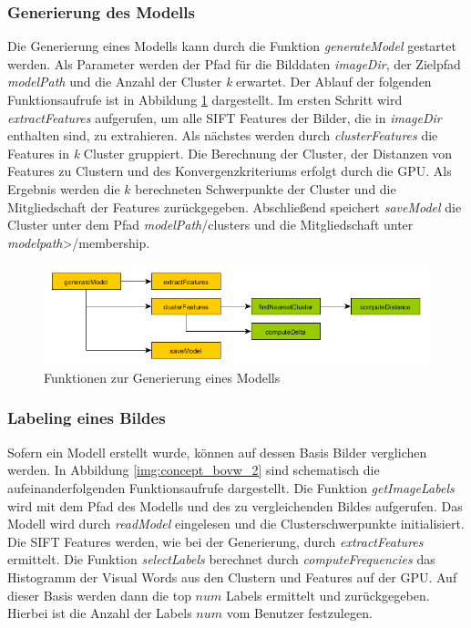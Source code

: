 \subsubsection{Generierung des Modells}

Die Generierung eines Modells kann durch die Funktion \textit{generateModel} gestartet werden. Als Parameter werden der Pfad für die Bilddaten \textit{imageDir}, der Zielpfad \textit{modelPath} und die Anzahl der Cluster \textit{k} erwartet. Der Ablauf der folgenden Funktionsaufrufe ist in Abbildung \ref{img:concept_bovw_1} dargestellt. Im ersten Schritt wird \textit{extractFeatures} aufgerufen, um alle SIFT Features der Bilder, die in \textit{imageDir} enthalten sind, zu extrahieren. Als nächstes werden durch \textit{clusterFeatures} die Features in \textit{k} Cluster gruppiert. Die Berechnung der Cluster, der Distanzen von Features zu Clustern und des Konvergenzkriteriums erfolgt durch die GPU. Als Ergebnis werden die $k$ berechneten Schwerpunkte der Cluster und die Mitgliedschaft der Features zurückgegeben. Abschließend speichert \textit{saveModel} die Cluster unter dem Pfad  \textit{modelPath}/clusters und die Mitgliedschaft unter \textit{modelpath}>/membership. 

\begin{figure}
	\centering
	\includegraphics[scale=0.8]{images/concept_bovw_1.png}
	\caption{Funktionen zur Generierung eines Modells}
	\label{img:concept_bovw_1}
\end{figure}

\subsubsection{Labeling eines Bildes}

Sofern ein Modell erstellt wurde, können auf dessen Basis Bilder verglichen werden. In Abbildung \ref{img:concept_bovw_2} sind schematisch die aufeinanderfolgenden Funktionsaufrufe dargestellt. Die Funktion \textit{getImageLabels} wird mit dem Pfad des Modells und des zu vergleichenden Bildes aufgerufen. Das Modell wird durch \textit{readModel} eingelesen und die Clusterschwerpunkte initialisiert. Die SIFT Features werden, wie bei der Generierung, durch \textit{extractFeatures} ermittelt. Die Funktion \textit{selectLabels} berechnet durch \textit{computeFrequencies} das Histogramm der Visual Words aus den Clustern und Features auf der GPU. Auf dieser Basis werden dann die top $num$ Labels ermittelt und zurückgegeben. Hierbei ist die Anzahl der Labels $num$ vom Benutzer festzulegen.

